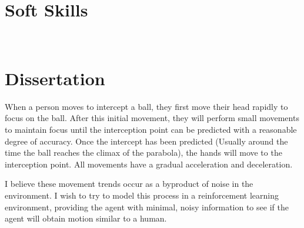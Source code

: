 \documentclass[11pt]{article} %
\begin{document}
\begin{paracol}{2}

\section{Soft Skills}





 \\


\vspace{20pt} %
\section{Dissertation}
When a person moves to intercept a ball, they first move their head rapidly to focus on the ball.
After this initial movement, they will perform small movements to maintain focus until
the interception point can be predicted with a reasonable degree of accuracy.
Once the intercept has been predicted (Usually around the time the ball reaches the climax of the parabola),
the hands will move to the interception point. All movements have a gradual acceleration and deceleration.

I believe these movement trends occur as a byproduct of noise in the environment. I wish to try to model this process in a reinforcement learning 
environment, providing the agent with minimal, noisy information to see if the agent will obtain motion similar to a human. 



\end{paracol}
\end{document}
